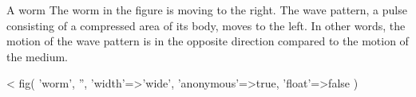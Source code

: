 \begin{eg}{A worm}\label{eg:worm}
The worm in the figure is moving to the right.
The wave pattern, a pulse consisting of a compressed area of
its body, moves to the left. In other words, the motion of the
wave pattern is in the opposite direction compared to the motion
of the medium.
\end{eg}

<%
  fig(
    'worm',
    '',
    {
      'width'=>'wide',
      'anonymous'=>true,
      'float'=>false
    }
  )
